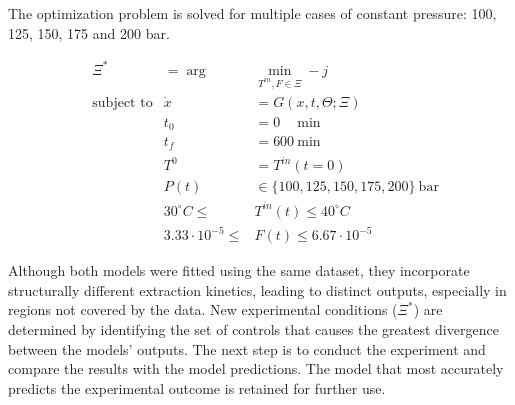 \documentclass[../Article_Design_of_Experiment.tex]{subfiles}
\begin{document}
	The optimization problem is solved for multiple cases of constant pressure: 100, 125, 150, 175 and 200 bar.
	
		{\footnotesize
		\begin{equation}
			\begin{aligned} 
				&\Xi^* &= \arg &\min_{ T^{in}, F \in \Xi} -j  \\
				&\text{subject to}
				& \dot{x} &= G(x,t,\Theta;\Xi) \\
				&& t_0&=0\quad~\text{min} \\
				&& t_f&=600~\text{min} \\
				&& T^{0} &= T^{in}(t=0) \\
				&& P(t) & \in \{100, 125, 150, 175, 200\}~\text{bar} \\
				&& 30^\circ C \leq &T^{in}(t) \leq 40^\circ C \\
				&& 3.33 \cdot 10^{-5} \leq &F(t) \leq 6.67 \cdot 10^{-5}
			\end{aligned} \label{EQ:Formulation}
	\end{equation} }
	
	Although both models were fitted using the same dataset, they incorporate structurally different extraction kinetics, leading to distinct outputs, especially in regions not covered by the data. New experimental conditions ($\Xi^*$) are determined by identifying the set of controls that causes the greatest divergence between the models’ outputs. The next step is to conduct the experiment and compare the results with the model predictions. The model that most accurately predicts the experimental outcome is retained for further use. 
\end{document}
